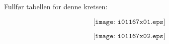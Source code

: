 
Fullfør  tabellen for denne kretsen:

$$\texttt{[image: i01167x01.eps]}$$







$$\texttt{[image: i01167x02.eps]}$$










